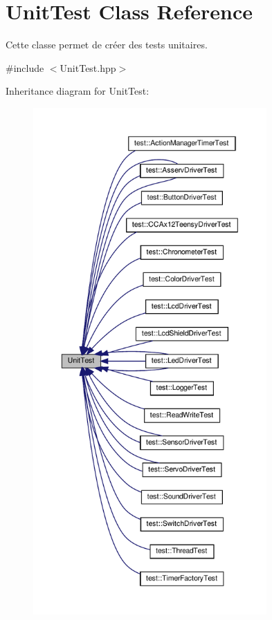 \hypertarget{classUnitTest}{}\section{Unit\+Test Class Reference}
\label{classUnitTest}


Cette classe permet de créer des tests unitaires.  




{\ttfamily \#include $<$Unit\+Test.\+hpp$>$}



Inheritance diagram for Unit\+Test\+:
\nopagebreak
\begin{figure}[H]
\begin{center}
\leavevmode
\includegraphics[height=550pt]{classUnitTest__inherit__graph}
\end{center}
\end{figure}
